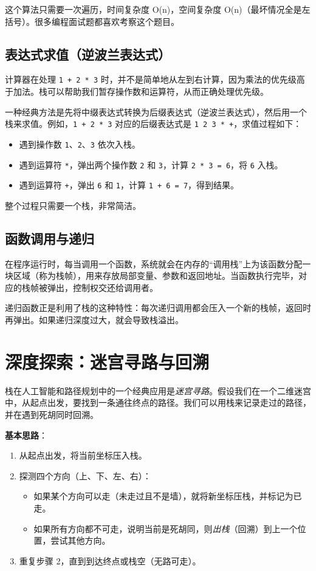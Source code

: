 这个算法只需要一次遍历，时间复杂度 O(n)，空间复杂度 O(n)（最坏情况全是左括号）。很多编程面试题都喜欢考察这个题目。

\subsection{表达式求值（逆波兰表达式）}

计算器在处理 \texttt{1 + 2 * 3} 时，并不是简单地从左到右计算，因为乘法的优先级高于加法。栈可以帮助我们暂存操作数和运算符，从而正确处理优先级。

一种经典方法是先将中缀表达式转换为后缀表达式（逆波兰表达式），然后用一个栈来求值。例如，\texttt{1 + 2 * 3} 对应的后缀表达式是 \texttt{1 2 3 * +}，求值过程如下：

\begin{itemize}
    \item 遇到操作数 \texttt{1}、\texttt{2}、\texttt{3} 依次入栈。
    \item 遇到运算符 \texttt{*}，弹出两个操作数 \texttt{2} 和 \texttt{3}，计算 \texttt{2 * 3 = 6}，将 \texttt{6} 入栈。
    \item 遇到运算符 \texttt{+}，弹出 \texttt{6} 和 \texttt{1}，计算 \texttt{1 + 6 = 7}，得到结果。
\end{itemize}

整个过程只需要一个栈，非常简洁。

\subsection{函数调用与递归}

在程序运行时，每当调用一个函数，系统就会在内存的“调用栈”上为该函数分配一块区域（称为栈帧），用来存放局部变量、参数和返回地址。当函数执行完毕，对应的栈帧被弹出，控制权交还给调用者。

递归函数正是利用了栈的这种特性：每次递归调用都会压入一个新的栈帧，返回时再弹出。如果递归深度过大，就会导致栈溢出。

\section{深度探索：迷宫寻路与回溯}

栈在人工智能和路径规划中的一个经典应用是\emph{迷宫寻路}。假设我们在一个二维迷宫中，从起点出发，要找到一条通往终点的路径。我们可以用栈来记录走过的路径，并在遇到死胡同时回溯。

\textbf{基本思路}：

\begin{enumerate}
    \item 从起点出发，将当前坐标压入栈。
    \item 探测四个方向（上、下、左、右）：
    \begin{itemize}
        \item 如果某个方向可以走（未走过且不是墙），就将新坐标压栈，并标记为已走。
        \item 如果所有方向都不可走，说明当前是死胡同，则\emph{出栈}（回溯）到上一个位置，尝试其他方向。
    \end{itemize}
    \item 重复步骤 2，直到到达终点或栈空（无路可走）。
\end{enumerate}

